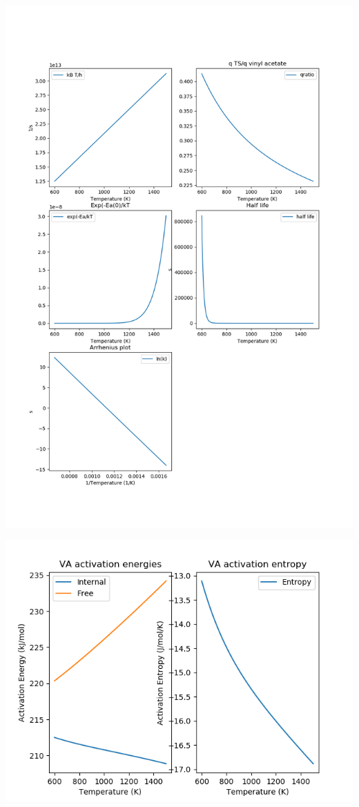 \documentclass[11pt]{article}
\begin{document}
\begin{center}
\includegraphics[width=.9\linewidth]{./Images/arrhenius.png}
\end{center}
\begin{center}
\includegraphics[width=.9\linewidth]{./Images/Sact.png}
\end{center}
\end{document}
